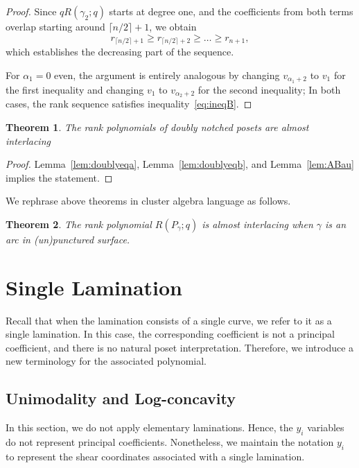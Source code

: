 \documentclass{article}
\newtheorem{theorem}{Theorem}
\theoremstyle{remark}
\begin{document}
\begin{proof}
Since \( q R(\gamma_2; q) \) starts at degree one, and the coefficients from both terms overlap starting around \( \lceil n/2 \rceil + 1 \), we obtain
\[
r_{\lceil n/2 \rceil + 1} \ge r_{\lceil n/2 \rceil + 2} \ge \dots \ge r_{n+1},
\]
which establishes the decreasing part of the sequence.

For \( \alpha_1=0 \) even, the argument is entirely analogous by changing $v_{\alpha_1+2}$ to $v_1$ for the first inequality and changing \( v_{1} \) to \( v_{\alpha_2+2} \) for the second inequality; In both cases, the rank sequence satisfies inequality~\textnormal{\eqref{eq:ineqB}}.
\end{proof}
\begin{theorem}
    The rank polynomials of doubly notched posets are almost interlacing
\end{theorem}

\begin{proof}
Lemma~\ref{lem:doublyeqa}, Lemma~\ref{lem:doublyeqb}, and Lemma~\ref{lem:ABau} implies the statement.
\end{proof}

We rephrase above theorems in cluster algebra language as follows.

\begin{theorem}
    The rank polynomial \( R(P_\gamma; q) \) is almost interlacing when \( \gamma \) is an arc in (un)punctured surface.
\end{theorem}


\section{Single Lamination}\label{sec:singlelam}

Recall that when the lamination consists of a single curve, we refer to it as a single lamination. In this case, the corresponding coefficient is not a principal coefficient, and there is no natural poset interpretation. Therefore, we introduce a new terminology for the associated polynomial.  

\subsection{Unimodality and Log-concavity}

In this section, we do not apply elementary laminations. Hence, the $y_i$ variables do not represent principal coefficients. Nonetheless, we maintain the notation $y_i$ to represent the shear coordinates associated with a single lamination.
\end{document}
